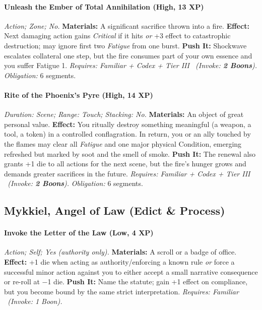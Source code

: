 \paragraph{Unleash the Ember of Total Annihilation (High, 13 XP)} \emph{Action; Zone; No.}
\textbf{Materials:} A significant sacrifice thrown into a fire.
\textbf{Effect:} Next damaging action gains \emph{Critical} if it hits \emph{or} +3 effect to catastrophic destruction; may ignore first two \emph{Fatigue} from one burst.
\textbf{Push It:} Shockwave escalates collateral one step, but the fire consumes part of your own essence and you suffer Fatigue 1.
\emph{Requires: Familiar + Codex + Tier III \ (\textit{Invoke:} \textbf{2 Boons}).}
\emph{Obligation:} 6 segments.

\paragraph{Rite of the Phoenix's Pyre (High, 14 XP)} \emph{Duration: Scene; Range: Touch; Stacking: No.}
\textbf{Materials:} An object of great personal value.
\textbf{Effect:} You ritually destroy something meaningful (a weapon, a tool, a token) in a controlled conflagration. In return, you or an ally touched by the flames may clear all \emph{Fatigue} and one major physical Condition, emerging refreshed but marked by soot and the smell of smoke.
\textbf{Push It:} The renewal also grants +1 die to all actions for the next scene, but the fire's hunger grows and demands greater sacrifices in the future.
\emph{Requires: Familiar + Codex + Tier III \ (\textit{Invoke:} \textbf{2 Boons}).}
\emph{Obligation:} 6 segments.

\subsection{Mykkiel, Angel of Law (Edict \& Process)}
\paragraph{Invoke the Letter of the Law (Low, 4 XP)} \emph{Action; Self; Yes (authority only).}
\textbf{Materials:} A scroll or a badge of office.
\textbf{Effect:} +1 die when acting as authority/enforcing a known rule \emph{or} force a successful minor action against you to either accept a small narrative consequence or re-roll at −1 die.
\textbf{Push It:} Name the statute; gain +1 effect on compliance, but you become bound by the same strict interpretation.
\emph{Requires: Familiar \ (\textit{Invoke:} 1 Boon).}
